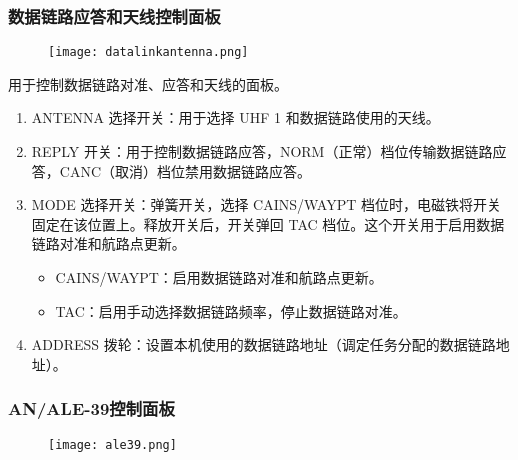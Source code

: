 \subsubsection{数据链路应答和天线控制面板}
\begin{figure}[htb]
  \center
  \texttt{[image: datalinkantenna.png]}
\end{figure}
用于控制数据链路对准、应答和天线的面板。

\begin{enumerate}
  \item ANTENNA 选择开关：用于选择 UHF 1 和数据链路使用的天线。
  \item REPLY 开关：用于控制数据链路应答，NORM（正常）档位传输数据链路应答，CANC（取消）档位禁用数据链路应答。
  \item MODE 选择开关：弹簧开关，选择 CAINS/WAYPT 档位时，电磁铁将开关固定在该位置上。释放开关后，开关弹回 TAC 档位。这个开关用于启用数据链路对准和航路点更新。
  \begin{itemize}
    \item CAINS/WAYPT：启用数据链路对准和航路点更新。
    \item TAC：启用手动选择数据链路频率，停止数据链路对准。
  \end{itemize}
  \item ADDRESS 拨轮：设置本机使用的数据链路地址（调定任务分配的数据链路地址）。
\end{enumerate}

\subsubsection{AN/ALE-39控制面板}
\begin{figure}[htb]
  \center
  \texttt{[image: ale39.png]}
\end{figure}

